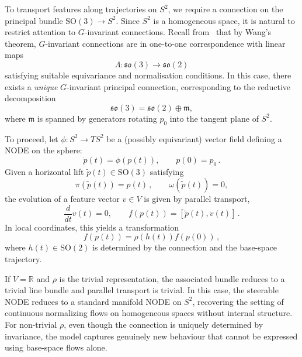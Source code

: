 \documentclass[12pt,a4paper]{article}
\numberwithin{equation}{section}
\theoremstyle{plain}
\theoremstyle{definition}
\theoremstyle{remark}
\begin{document}
To transport features along trajectories on $S^2$, we require a connection on the principal bundle $\mathrm{SO}(3) \to S^2$. Since $S^2$ is a homogeneous space, it is natural to restrict attention to $G$-invariant connections. Recall from~ that by Wang's theorem, $G$-invariant connections are in one-to-one correspondence with linear maps
\begin{equation}
    \Lambda : \mathfrak{so}(3) \to \mathfrak{so}(2)
\end{equation}
satisfying suitable equivariance and normalisation conditions. In this case, there exists a \emph{unique} $G$-invariant principal connection, corresponding to the reductive decomposition
\begin{equation}
    \mathfrak{so}(3) = \mathfrak{so}(2) \oplus \mathfrak{m},
\end{equation}
where $\mathfrak{m}$ is spanned by generators rotating $p_0$ into the tangent plane of $S^2$.

To proceed, let $\phi : S^2 \to TS^2$ be a (possibly equivariant) vector field defining a NODE on the sphere:
\begin{equation}
    \dot p(t) = \phi(p(t)), \qquad p(0) = p_0 \,.
\end{equation}
Given a horizontal lift $\tilde p(t) \in \mathrm{SO}(3)$ satisfying
\begin{equation}
    \pi(\tilde p(t)) = p(t)\,, \qquad \omega(\dot{\tilde p}(t)) = 0,
\end{equation}
the evolution of a feature vector $v \in V$ is given by parallel transport,
\begin{equation}
    \frac{d}{dt} v(t) = 0, \qquad f(p(t)) = [\tilde p(t), v(t)] \,.
\end{equation}
In local coordinates, this yields a transformation
\begin{equation}
    f(p(t)) = \rho(h(t)) f(p(0))\,,
\end{equation}
where $h(t) \in \mathrm{SO}(2)$ is determined by the connection and the base-space trajectory.

If $V = \mathbb{R}$ and $\rho$ is the trivial representation, the associated bundle reduces to a trivial line bundle and parallel transport is trivial. In this case, the steerable NODE reduces to a standard manifold NODE on $S^2$, recovering the setting of continuous normalizing flows on homogeneous spaces without internal structure. For non-trivial $\rho$, even though the connection is uniquely determined by invariance, the model captures genuinely new behaviour that cannot be expressed using base-space flows alone.
\end{document}
